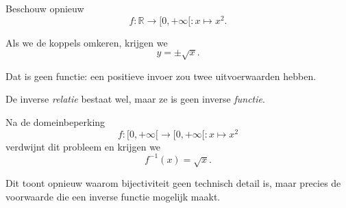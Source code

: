 \documentclass{ximera}
\begin{document}

Beschouw opnieuw
\[
f:\mathbb R\to[0,+\infty[:x\mapsto x^2.
\]

Als we de koppels omkeren, krijgen we
\[
y=\pm\sqrt{x}.
\]

Dat is geen functie: een positieve invoer zou twee uitvoerwaarden hebben.

\begin{center}
\end{center}

De inverse \emph{relatie} bestaat wel, maar ze is geen inverse \emph{functie}.

Na de domeinbeperking
\[
f:[0,+\infty[\to[0,+\infty[:x\mapsto x^2
\]
verdwijnt dit probleem en krijgen we
\[
f^{-1}(x)=\sqrt{x}.
\]

Dit toont opnieuw waarom bijectiviteit geen technisch detail is, maar precies
de voorwaarde die een inverse functie mogelijk maakt.
\end{document}
